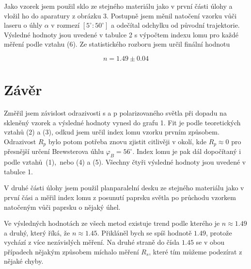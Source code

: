 \documentclass[a4paper,11pt]{article}
\begin{document}
Jako vzorek jsem použil sklo ze stejného materiálu jako v první části úlohy a vložil ho do aparatury z obrázku 3. Postupně jsem měnil natočení vzorku vůči laseru o úhly $ \alpha $ v rozmezí $ [5^{\circ}:50^{\circ}] $ a odečítal odchylku od původní trajektorie. Výsledné hodnoty jsou uvedené v tabulce 2 s výpočtem indexu lomu pro každé měření podle vztahu (6). Ze statistického rozboru jsem určil finální hodnotu

\begin{equation*}
n = 1.49 \pm 0.04
\end{equation*}

\newpage

\section{Závěr}

Změřil jsem závislost odrazivosti s a p polarizovaného světla při dopadu na skleněný vzorek a výsledné hodnoty vynesl do grafu 1. Fit je podle teoretických vztahů (2) a (3), odkud jsem určil index lomu vzorku prvním způsobem. Odrazivost $ R_p $ bylo potom potřeba znovu zjistit citlivěji v okolí, kde $ R_p \approx 0 $ pro přesnější určení Brewsterova úhlu $ \varphi_B = 56 ^{\circ}   $. Index lomu je pak dál dopočítaný i podle vztahů~(1),~nebo (4) a (5). Všechny čtyři výsledné hodnoty jsou uvedené v tabulce 1. 

V druhé části úlohy jsem použil planparalelní desku ze stejného materiálu jako v první čási a měřil index lomu z posunutí paprsku světla po průchodu vzorkem natočeným vůči paprsku o nějaký úhel. 

Ve výsledných hodnotách ze všech metod existuje trend podle kterého je $ n \approx 1.49 $ a druhý, který říká, že $ n \approx 1.45 $. Přikláněl bych se spíš hodnotě $ 1.49 $, protože vychází z více nezávislých měření. Na druhé straně do čísla $ 1.45 $ se v obou případech nějakým způsobem míchalo měření $ R_s $, které tím můžeme podezírat z nějaké chyby.
\end{document}
